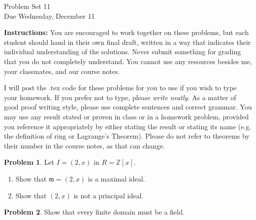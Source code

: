 \documentclass[11pt]{article}
\title{}
\date{\vspace{-0.5in}}
\newcommand{\ZZ}{\mathbb{Z}}
\theoremstyle{definition}
\newtheorem{problem}{Problem}
\begin{document}
\thispagestyle{fancy}
\pagestyle{fancy}

\vspace{3em}

\begin{center}
	{\LARGE Problem Set 11\\}
	Due Wednesday, December 11
\end{center}

\vspace{0.5em}

\noindent
{\bf Instructions:}
You are encouraged to work together on these problems, but each student should hand in their own final draft, written in a way that indicates their individual understanding of the solutions. Never submit something for grading that you do not completely understand. You cannot use any resources besides me, your classmates, and our course notes.


I will post the .tex code for these problems for you to use if you wish to type your homework. If you prefer not to type, please  {\em write neatly}. As a matter of good proof writing style, please use complete sentences and correct grammar. You may use any result  stated or proven in class or in a homework problem, provided you reference it appropriately by either stating the result or stating its name (e.g. the definition of ring or Lagrange's Theorem). Please do not refer to theorems by their number in the course notes, as that can change.


\vspace{2em}




\begin{problem}
	Let $I = (2,x)$ in $R = \ZZ[x]$.
	
	\vspace{-0.5em}
\begin{enumerate}[label=(1.\arabic*), itemsep=0.1em]
		\item Show that $\mathfrak{m} = (2, x)$ is a maximal ideal.
		
		\item Show that $(2,x)$ is not a principal ideal.		
\end{enumerate}
\end{problem}



\begin{problem}
	Show that every finite domain must be a field.
\end{problem}
\end{document}
